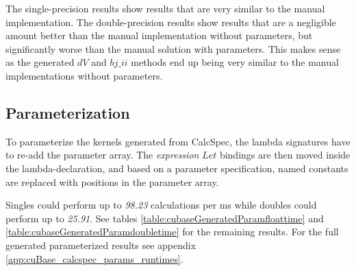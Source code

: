 \begin{table}[h!]
\centering
{}
\caption{CalcSpec generated F\# Alea.cuBase calculations per ms with double precision\label{table:cubaseGenerateddoubletime}}
\end{table}

The single-precision results show results that are very similar to the manual implementation.
The double-precision results show results that are a negligible amount better than the manual implementation without parameters, but significantly worse than the manual solution with parameters.
This makes sense as the generated $dV$ and $bj\_ii$ methods end up being very similar to the manual implementations without parameters.

\subsection{Parameterization}
To parameterize the kernels generated from CalcSpec, the lambda signatures have to re-add the parameter array.
The \emph{expression} $Let$ bindings are then moved inside the lambda-declaration, and based on a parameter specification, named constants are replaced with positions in the parameter array.

Singles could perform up to \emph{98.23} calculations per ms while doubles could perform up to \emph{25.91}.
See tables \ref{table:cubaseGeneratedParamfloattime} and \ref{table:cubaseGeneratedParamdoubletime} for the remaining results.
For the full generated parameterized results see appendix \ref{app:cuBase_calcspec_params_runtimes}.

